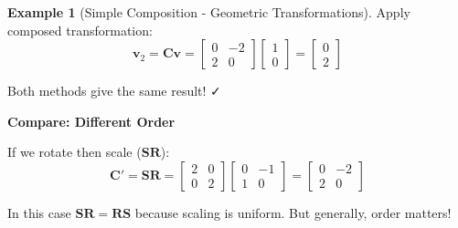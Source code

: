 \documentclass[12pt,a4paper]{article}
\theoremstyle{definition}
\newtheorem{example}{Example}[section]
\begin{document}
\begin{example}[Simple Composition - Geometric Transformations]
Apply composed transformation:
\[
\mathbf{v}_2 = \mathbf{C}\mathbf{v} = \begin{bmatrix}
0 & -2 \\
2 & 0
\end{bmatrix}
\begin{bmatrix}
1 \\ 0
\end{bmatrix}
= \begin{bmatrix}
0 \\ 2
\end{bmatrix}
\]

Both methods give the same result! ✓

\textbf{Compare: Different Order}

If we rotate then scale ($\mathbf{SR}$):
\[
\mathbf{C}' = \mathbf{S}\mathbf{R} = \begin{bmatrix}
2 & 0 \\
0 & 2
\end{bmatrix}
\begin{bmatrix}
0 & -1 \\
1 & 0
\end{bmatrix}
= \begin{bmatrix}
0 & -2 \\
2 & 0
\end{bmatrix}
\]

In this case $\mathbf{SR} = \mathbf{RS}$ because scaling is uniform. But generally, order matters!
\end{example}
\end{document}
